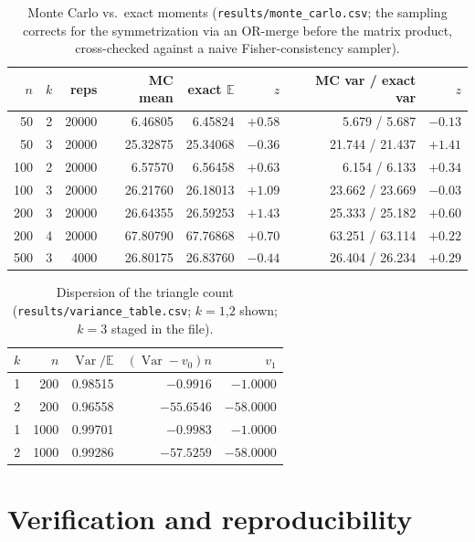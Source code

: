 \documentclass[11pt,a4paper]{article}
\theoremstyle{definition}
\theoremstyle{definition}
\begin{document}
\begin{table}[t]
\centering
\caption{Monte Carlo vs.\ exact moments (\texttt{results/monte\_carlo.csv}; the
sampling corrects for the symmetrization via an OR-merge before the matrix
product, cross-checked against a naive Fisher-consistency sampler).}
\label{tab:mc}
\begin{tabular}{rrrrrrrr}
\toprule
$n$ & $k$ & reps & MC mean & exact $\mathbb E$ & $z$ & MC var / exact var & $z$\\
\midrule
50 & 2 & 20000 & 6.46805 & 6.45824 & $+0.58$ & 5.679 / 5.687 & $-0.13$\\
50 & 3 & 20000 & 25.32875 & 25.34068 & $-0.36$ & 21.744 / 21.437 & $+1.41$\\
100 & 2 & 20000 & 6.57570 & 6.56458 & $+0.63$ & 6.154 / 6.133 & $+0.34$\\
100 & 3 & 20000 & 26.21760 & 26.18013 & $+1.09$ & 23.662 / 23.669 & $-0.03$\\
200 & 3 & 20000 & 26.64355 & 26.59253 & $+1.43$ & 25.333 / 25.182 & $+0.60$\\
200 & 4 & 20000 & 67.80790 & 67.76868 & $+0.70$ & 63.251 / 63.114 & $+0.22$\\
500 & 3 & 4000 & 26.80175 & 26.83760 & $-0.44$ & 26.404 / 26.234 & $+0.29$\\
\bottomrule
\end{tabular}
\end{table}

\begin{table}[t]
\centering
\caption{Dispersion of the triangle count (\texttt{results/variance\_table.csv};
$k=1$,$2$ shown; $k=3$ staged in the file).}
\label{tab:var}
\begin{tabular}{rrrrr}
\toprule
$k$ & $n$ & $\operatorname{Var}/\mathbb E$ & $(\operatorname{Var}-v_0)n$ & $v_1$\\
\midrule
1 & 200 & 0.98515 & $-0.9916$ & $-1.0000$\\
2 & 200 & 0.96558 & $-55.6546$ & $-58.0000$\\
1 & 1000 & 0.99701 & $-0.9983$ & $-1.0000$\\
2 & 1000 & 0.99286 & $-57.5259$ & $-58.0000$\\
\bottomrule
\end{tabular}
\end{table}

\section{Verification and reproducibility}\label{sec:repro}
\end{document}
